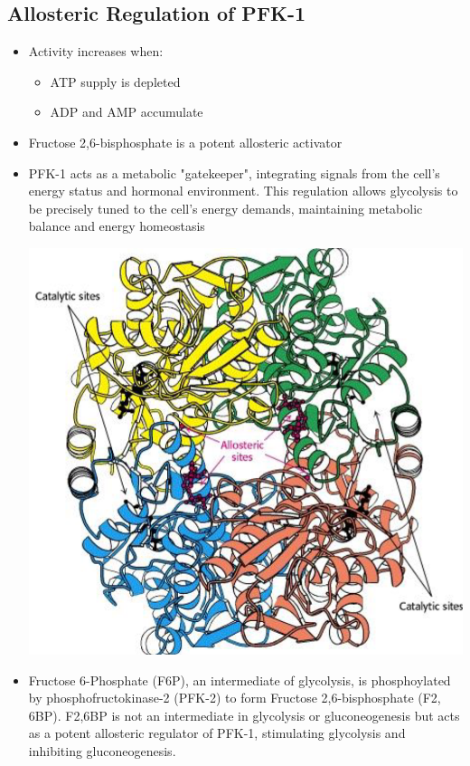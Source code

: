 \documentclass[10pt]{article}
\begin{document}
\subsection*{Allosteric Regulation of PFK-1}
\begin{itemize}
	\item Activity increases when:
	\begin{itemize}
        \item ATP supply is depleted
        \item ADP and AMP accumulate
    \end{itemize}
    \item Fructose 2,6-bisphosphate is a potent allosteric activator
    \item PFK-1 acts as a metabolic "gatekeeper", integrating signals from the cell's energy status and hormonal environment.  This regulation allows glycolysis to be precisely tuned to the cell's energy demands, maintaining metabolic balance and energy homeostasis
    \begin{center} 
        \includegraphics*[scale=0.6]{L1_7.png}
    \end{center}
    \item Fructose 6-Phosphate (F6P), an intermediate of glycolysis, is phosphoylated by phosphofructokinase-2 (PFK-2) to form Fructose 2,6-bisphosphate (F2, 6BP).  F2,6BP is not an intermediate in glycolysis or gluconeogenesis but acts as a potent allosteric regulator of PFK-1, stimulating glycolysis and inhibiting gluconeogenesis.
\end{itemize}
\end{document}

